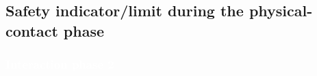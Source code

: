 \subsection{Safety indicator/limit during the physical-contact phase}
\begin{frame}
\frametitle{{\textcolor{white}{\hspace{0.3cm}Interaction phase 2}}}
\begin{center}     
{\fontsize{25}{60}}
\end{center}             
\end{frame}





%




